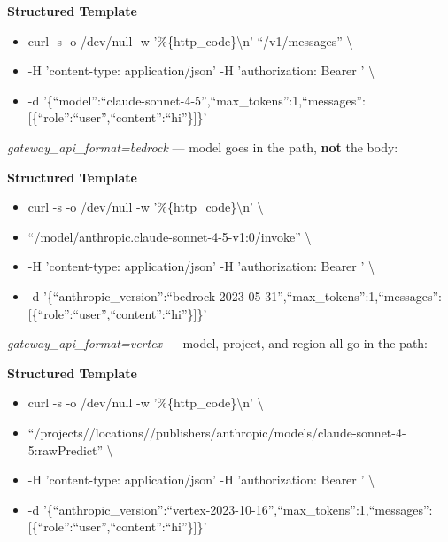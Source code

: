 \documentclass[11pt]{article}
\begin{document}
\textbf{Structured Template}
\begin{itemize}[leftmargin=*,itemsep=2pt,topsep=2pt]
\item {} curl -s -o /dev/null -w '\%\{http\_\allowbreak{}code\}\textbackslash{}n' ``/v1/messages'' \textbackslash{}
\item {} -H 'content-type: application/json' -H 'authorization: Bearer ' \textbackslash{}
\item {} -d '\{``model'':``claude-sonnet-4-5'',``max\_\allowbreak{}tokens'':1,``messages'':[\{``role'':``user'',``content'':``hi''\}]\}'
\end{itemize}

\emph{gateway\_\allowbreak{}api\_\allowbreak{}format=bedrock} — model goes in the path, \textbf{not} the body:

\textbf{Structured Template}
\begin{itemize}[leftmargin=*,itemsep=2pt,topsep=2pt]
\item {} curl -s -o /dev/null -w '\%\{http\_\allowbreak{}code\}\textbackslash{}n' \textbackslash{}
\item {} ``/model/anthropic.claude-sonnet-4-5-v1:0/invoke'' \textbackslash{}
\item {} -H 'content-type: application/json' -H 'authorization: Bearer ' \textbackslash{}
\item {} -d '\{``anthropic\_\allowbreak{}version'':``bedrock-2023-05-31'',``max\_\allowbreak{}tokens'':1,``messages'':[\{``role'':``user'',``content'':``hi''\}]\}'
\end{itemize}

\emph{gateway\_\allowbreak{}api\_\allowbreak{}format=vertex} — model, project, and region all go in the path:

\textbf{Structured Template}
\begin{itemize}[leftmargin=*,itemsep=2pt,topsep=2pt]
\item {} curl -s -o /dev/null -w '\%\{http\_\allowbreak{}code\}\textbackslash{}n' \textbackslash{}
\item {} ``/projects//locations//publishers/anthropic/models/claude-sonnet-4-5:rawPredict'' \textbackslash{}
\item {} -H 'content-type: application/json' -H 'authorization: Bearer ' \textbackslash{}
\item {} -d '\{``anthropic\_\allowbreak{}version'':``vertex-2023-10-16'',``max\_\allowbreak{}tokens'':1,``messages'':[\{``role'':``user'',``content'':``hi''\}]\}'
\end{itemize}
\end{document}
